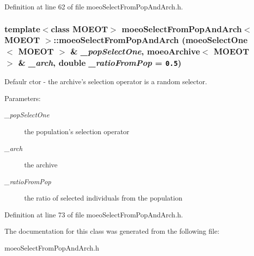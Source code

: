 Definition at line 62 of file moeo\-Select\-From\-Pop\-And\-Arch.h.
\subsubsection{\setlength{\rightskip}{0pt plus 5cm}template$<$class MOEOT$>$ \bf{moeo\-Select\-From\-Pop\-And\-Arch}$<$ MOEOT $>$::\bf{moeo\-Select\-From\-Pop\-And\-Arch} (\bf{moeo\-Select\-One}$<$ MOEOT $>$ \& {\em \_\-pop\-Select\-One}, \bf{moeo\-Archive}$<$ MOEOT $>$ \& {\em \_\-arch}, double {\em \_\-ratio\-From\-Pop} = {\tt 0.5})\hspace{0.3cm}{\tt  [inline]}}\label{classmoeoSelectFromPopAndArch_1c225b5f7b5a5ce6e87b46a7ea4a4cd0}


Defaulr ctor - the archive's selection operator is a random selector. 

\begin{Desc}
\item[Parameters:]
\begin{description}
\item[{\em \_\-pop\-Select\-One}]the population's selection operator \item[{\em \_\-arch}]the archive \item[{\em \_\-ratio\-From\-Pop}]the ratio of selected individuals from the population \end{description}
\end{Desc}


Definition at line 73 of file moeo\-Select\-From\-Pop\-And\-Arch.h.

The documentation for this class was generated from the following file:\begin{CompactItemize}
\item 
moeo\-Select\-From\-Pop\-And\-Arch.h\end{CompactItemize}
